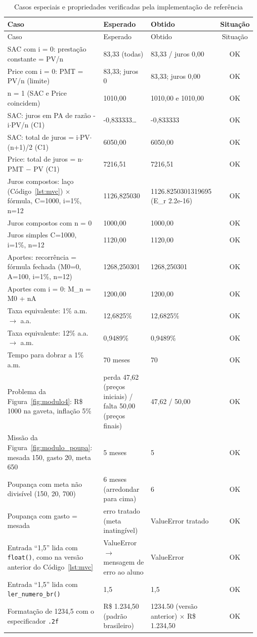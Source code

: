 \begin{longtable}{L{0.40\textwidth}L{0.20\textwidth}L{0.20\textwidth}c}
\caption{Casos especiais e propriedades verificadas pela implementação de referência}\label{tab:casos-especiais}\\
\hline
Caso & Esperado & Obtido & Situação \\
\hline
\endfirsthead
\hline
Caso & Esperado & Obtido & Situação \\
\hline
\endhead
SAC com i = 0: prestação constante = PV/n & 83,33 (todas) & 83,33 / juros 0,00 & OK \\
Price com i = 0: PMT = PV/n (limite) & 83,33; juros 0 & 83,33; juros 0,00 & OK \\
n = 1 (SAC e Price coincidem) & 1010,00 & 1010,00 e 1010,00 & OK \\
SAC: juros em PA de razão -i$\cdot$PV/n (C1) & -0,833333\ldots{} & -0,833333 & OK \\
SAC: total de juros = i$\cdot$PV$\cdot$(n+1)/2 (C1) & 6050,00 & 6050,00 & OK \\
Price: total de juros = n$\cdot$PMT $-$ PV (C1) & 7216,51 & 7216,51 & OK \\
Juros compostos: laço (Código~\ref{lst:mvc}) $\times$ fórmula, C=1000, i=1\%, n=12 & 1126,825030 & 1126.8250301319695 (E\_r 2.2e-16) & OK \\
Juros compostos com n = 0 & 1000,00 & 1000,00 & OK \\
Juros simples C=1000, i=1\%, n=12 & 1120,00 & 1120,00 & OK \\
Aportes: recorrência = fórmula fechada (M0=0, A=100, i=1\%, n=12) & 1268,250301 & 1268,250301 & OK \\
Aportes com i = 0: M\_n = M0 + nA & 1200,00 & 1200,00 & OK \\
Taxa equivalente: 1\% a.m. $\to$ a.a. & 12,6825\% & 12,6825\% & OK \\
Taxa equivalente: 12\% a.a. $\to$ a.m. & 0,9489\% & 0,9489\% & OK \\
Tempo para dobrar a 1\% a.m. & 70 meses & 70 & OK \\
Problema da Figura~\ref{fig:modulo4}: R\$ 1000 na gaveta, inflação 5\% & perda 47,62 (preços iniciais) / falta 50,00 (preços finais) & 47,62 / 50,00 & OK \\
Missão da Figura~\ref{fig:modulo_poupa}: mesada 150, gasto 20, meta 650 & 5 meses & 5 & OK \\
Poupança com meta não divisível (150, 20, 700) & 6 meses (arredondar para cima) & 6 & OK \\
Poupança com gasto = mesada & erro tratado (meta inatingível) & ValueError tratado & OK \\
Entrada ``1,5'' lida com \texttt{float()}, como na versão anterior do Código~\ref{lst:mvc} & ValueError $\to$ mensagem de erro ao aluno & ValueError & OK \\
Entrada ``1,5'' lida com \texttt{ler\_numero\_br()} & 1,5 & 1,5 & OK \\
Formatação de 1234,5 com o especificador \texttt{.2f} & R\$ 1.234,50 (padrão brasileiro) & 1234.50 (versão anterior) $\times$ R\$ 1.234,50 & OK \\
\hline
\end{longtable}
